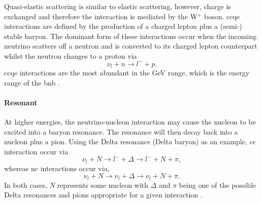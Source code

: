 Quasi-elastic scattering is similar to elastic scattering, however, charge is exchanged and therefore the interaction is mediated by the W$^+$ boson. \gls{ccqe} interactions are defined by the production of a charged lepton plus a (semi-) stable baryon. The dominant form of these interactions occur when the incoming neutrino scatters off a neutron and is converted to its charged lepton counterpart whilst the neutron changes to a proton via
\begin{equation}
    \nu_l + n \rightarrow l^- + p.
\end{equation}
\gls{ccqe} interactions are the most abundant in the GeV range, which is the energy range of the \gls{bnb} \cite{Measurement_of_the_Antineutrino_Double-Differential_Charged-Current_Quasi-Elastic_Scattering_Cross_Section_at_MINERvA_book}. 

\paragraph{Resonant}
At higher energies, the neutrino-nucleon interaction may cause the nucleon to be excited into a baryon resonance. The resonance will then decay back into a nucleon plus a pion. Using the Delta resonance (Delta baryon) as an example, \gls{cc} interaction occur via
\begin{equation}
    \nu_l + N \rightarrow l^- + \Delta \rightarrow l^- + N + \pi,
\end{equation}
whereas \gls{nc} interactions occur via,
\begin{equation}
    \nu_l + N \rightarrow \nu_l + \Delta \rightarrow \nu_l + N +\pi.
\end{equation}
In both cases, \textit{N} represents some nucleon with $\Delta$ and $\pi$ being one of the possible Delta resonances and pions appropriate for a given interaction \cite{Measurement_of_the_Antineutrino_Double-Differential_Charged-Current_Quasi-Elastic_Scattering_Cross_Section_at_MINERvA_book} \cite{Measurement_of_the_Water_to_Scintillator_Charged-Current_Cross-Section_Ratio_for_Muon_Neutrinos_at_the_T2K_Near_Detector_thesis}. 


